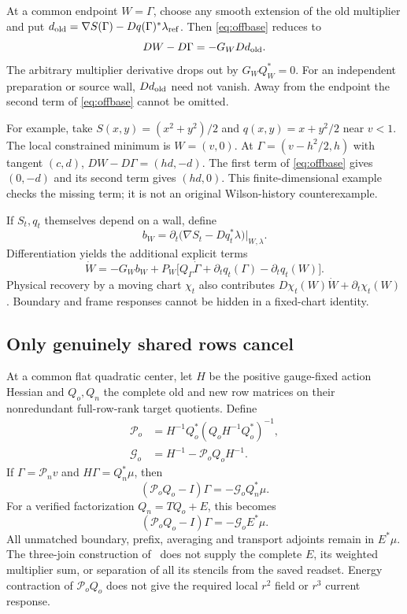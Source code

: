 \documentclass[11pt,letterpaper]{article}
\numberwithin{equation}{section}
\theoremstyle{plain}
\theoremstyle{remark}\newtheorem{remark}[theorem]{Scope}
\begin{document}
At a common endpoint $W=\Gamma$, choose any smooth extension of the old
multiplier and put
$d_{\rm old}=\nabla S(\Gamma)-Dq(\Gamma)^*\lambda_{\rm ref}$.
Then \eqref{eq:offbase} reduces to
\begin{equation}
 DW-D\Gamma=-G_WDd_{\rm old}.
 \label{eq:defect}
\end{equation}
The arbitrary multiplier derivative drops out by $G_WQ_W^*=0$.
For an independent preparation or source wall, $Dd_{\rm old}$ need not
vanish. Away from the endpoint the second term of \eqref{eq:offbase}
cannot be omitted.

For example, take $S(x,y)=(x^2+y^2)/2$ and $q(x,y)=x+y^2/2$ near
$v<1$. The local constrained minimum is $W=(v,0)$. At
$\Gamma=(v-h^2/2,h)$ with tangent $(c,d)$,
$DW-D\Gamma=(hd,-d)$. The first term of \eqref{eq:offbase} gives
$(0,-d)$ and its second term gives $(hd,0)$. This finite-dimensional
example checks the missing term; it is not an original Wilson-history
counterexample.

If $S_t,q_t$ themselves depend on a wall, define
\[
 b_W=\partial_t\bigl(\nabla S_t-Dq_t^*\lambda\bigr)\big|_{W,\lambda}.
\]
Differentiation yields the additional explicit terms
\begin{equation}
 \dot W=-G_Wb_W+P_W\bigl[
 Q_\Gamma\dot\Gamma+\partial_tq_t(\Gamma)-\partial_tq_t(W)\bigr].
 \label{eq:moving}
\end{equation}
Physical recovery by a moving chart $\chi_t$ also contributes
$D\chi_t(W)\dot W+\partial_t\chi_t(W)$. Boundary and frame responses
cannot be hidden in a fixed-chart identity.

\subsection{Only genuinely shared rows cancel}

At a common flat quadratic center, let $H$ be the positive gauge-fixed
action Hessian and $Q_o,Q_n$ the complete old and new row matrices on their
nonredundant full-row-rank target quotients. Define
\begin{align}
 \mathcal P_o&=H^{-1}Q_o^*(Q_oH^{-1}Q_o^*)^{-1},\\
 \mathcal G_o&=H^{-1}-\mathcal P_oQ_oH^{-1}.
\end{align}
If $\Gamma=\mathcal P_n v$ and $H\Gamma=Q_n^*\mu$, then
\begin{equation}
 (\mathcal P_oQ_o-I)\Gamma=-\mathcal G_oQ_n^*\mu.
\end{equation}
For a verified factorization $Q_n=TQ_o+E$, this becomes
\begin{equation}
 (\mathcal P_oQ_o-I)\Gamma=-\mathcal G_oE^*\mu.
 \label{eq:rowdefect}
\end{equation}
All unmatched boundary, prefix, averaging and transport adjoints remain
in $E^*\mu$. The three-join construction of~\cite{iii} does not supply the
complete $E$, its weighted multiplier sum, or separation of all its
stencils from the saved readset. Energy contraction of $\mathcal P_oQ_o$
does not give the required local $r^2$ field or $r^3$ current response.
\end{document}
